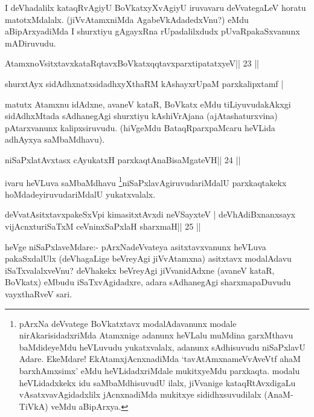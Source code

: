 \begin{artha}
I deVhadalilx kataqRvAgiyU BoVkatxyXvAgiyU iruvavaru deVvategaLeV horatu matotxMdalalx. (jiVvAtamxniMda AgabeVkAdadedxVnu?) eMdu aBipArxyadiMda I shurxtiyu gAgayxRna rUpadalilxdudx pUvaRpakaSxvanunx mADiruvudu.
\end{artha}

\begin{shl}
AtamxnoV\s sitxtavxkataRqtavxBoVkatxqqtavxparxtipatatxyeV\hfill || 23 ||
\end{shl}

\begin{shl}
shurxtAyx sidAdhxnatxsidadhxyXthaRM kAshayxrUpaM parxkalipxtamf |
\end{shl}

\begin{artha}
matutx Atamxnu idAdxne, avaneV kataR, BoVkatx eMdu tiLiyuvudakAkxgi sidAdhxMtada sAdhanegAgi shurxtiyu kAshiVrAjana (ajAtashaturxvina) pAtarxvanunx kalipxsiruvudu. (hiVgeMdu BataqRparxpaMcaru heVLida adhAyxya saMbaMdhavu).
\end{artha} 
 

\begin{shl}
niSaPxlatAvxtasx cAyukatxH parxkaqtAnaBisaMgateVH\hfill || 24 ||
\end{shl}

\begin{artha}
ivaru heVLuva saMbaMdhavu \footnote[1]{pArxNa deVvatege BoVkatxtavx 
modalAdavanunx modale nirAkarisidadxriMda Atamxnige adanunx heVLalu 
muMdina garxMthavu baMdideyeMdu heVLuvudu yukatxvalalx, adanunx sAdhisuvudu niSaPxlavU Adare. EkeMdare! EkAtamxjAcnxnadiMda `tavAtAmxnameVvAveVtf ahaM barxhAmxsimx' eMdu heVLidadxriMdale mukitxyeMdu parxkaqta. modalu heVLidadxkekx idu saMbaMdhisuvudU ilalx, jiVvanige kataqRtAvxdigaLu vAsatxvavAgidadxlilx jAcnxnadiMda mukitxye sididhxsuvudilalx (AnaM-TiVkA) veMdu aBipArxya.
}niSaPxlavAgiruvudariMdalU parxkaqtakekx hoMdadeyiruvudariMdalU yukatxvalalx.
\end{artha}

\begin{shl}
deVvatAsitxtavxpakeSxV\s pi kimasitxtAvxdi neVSayxteV |
deVhAdiBxnanxsayx vijAcnxturiSaTxM ceVninxSaPxlaH sharxmaH\hfill || 25 ||
\end{shl}

\begin{artha}
heVge niSaPxlaveMdare:- pArxNadeVvateya asitxtavxvanunx heVLuva  pakaSxdalUlx (deVhagaLige beVreyAgi jiVvAtamxna) asitxtavx modalAdavu  iSaTxvalalxveVnu? deVhakekx beVreyAgi jiVvanidAdxne (avaneV kataR, BoVkatx) eMbudu iSaTxvAgidadxre, adara sAdhanegAgi sharxmapaDuvudu vayxthaRveV sari.
\end{artha}

